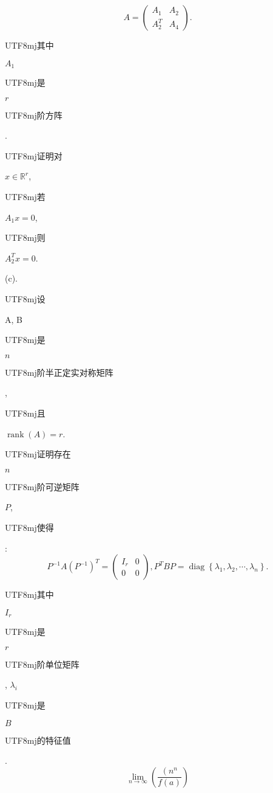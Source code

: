 \documentclass[10pt]{article}
\begin{document}
$$
A=\left(\begin{array}{ll}
A_{1} & A_{2} \\
A_{2}^{T} & A_{4}
\end{array}\right) .
$$
\begin{CJK}{UTF8}{mj}其中\end{CJK} $A_{1}$ \begin{CJK}{UTF8}{mj}是\end{CJK} $r$ \begin{CJK}{UTF8}{mj}阶方阵\end{CJK}. \begin{CJK}{UTF8}{mj}证明对\end{CJK} $x \in \mathbb{R}^{r}$, \begin{CJK}{UTF8}{mj}若\end{CJK} $A_{1} x=0$, \begin{CJK}{UTF8}{mj}则\end{CJK} $A_{2}^{T} x=0$.

(c). \begin{CJK}{UTF8}{mj}设\end{CJK} A, B \begin{CJK}{UTF8}{mj}是\end{CJK} $n$ \begin{CJK}{UTF8}{mj}阶半正定实对称矩阵\end{CJK}, \begin{CJK}{UTF8}{mj}且\end{CJK} $\operatorname{rank}(A)=r$. \begin{CJK}{UTF8}{mj}证明存在\end{CJK} $n$ \begin{CJK}{UTF8}{mj}阶可逆矩阵\end{CJK} $P$, \begin{CJK}{UTF8}{mj}使得\end{CJK}:
$$
P^{-1} A\left(P^{-1}\right)^{T}=\left(\begin{array}{cc}
I_{r} & 0 \\
0 & 0
\end{array}\right), P^{T} B P=\operatorname{diag}\left\{\lambda_{1}, \lambda_{2}, \cdots, \lambda_{n}\right\} .
$$
\begin{CJK}{UTF8}{mj}其中\end{CJK} $I_{r}$ \begin{CJK}{UTF8}{mj}是\end{CJK} $r$ \begin{CJK}{UTF8}{mj}阶单位矩阵\end{CJK}, $\lambda_{i}$ \begin{CJK}{UTF8}{mj}是\end{CJK} $B$ \begin{CJK}{UTF8}{mj}的特征值\end{CJK}.
$$
\lim _{n \rightarrow \infty}\left(\frac{\left(n^{n}\right.}{f(a)}\right)
$$
\end{document}
